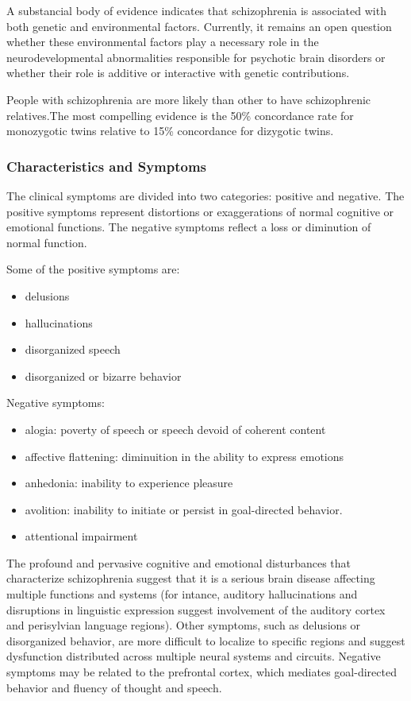 \documentclass[12pt,article,oneside,a4paper]{memoir}
\begin{document}
A substancial body of evidence indicates that schizophrenia is associated with both genetic and environmental factors. Currently, it remains an open question whether these environmental factors play a necessary role in the neurodevelopmental abnormalities responsible for psychotic brain disorders or whether their role is additive or interactive with genetic contributions.

People with schizophrenia are more likely than other to have schizophrenic relatives.The most compelling evidence is the 50\% concordance rate for monozygotic twins relative to 15\% concordance for dizygotic twins.

\subsubsection{Characteristics and Symptoms}

The clinical symptoms are divided into two categories: positive and negative. The positive symptoms represent distortions or exaggerations of normal cognitive or emotional functions. The negative symptoms reflect a loss or diminution of normal function.

Some of the positive symptoms are:
\begin{itemize}
\item delusions
\item hallucinations
\item disorganized speech
\item disorganized or bizarre behavior
\end{itemize}

Negative symptoms:
\begin{itemize}
\item alogia: poverty of speech or speech devoid of coherent content
\item affective flattening: diminuition in the ability to express emotions
\item anhedonia: inability to experience pleasure
\item avolition: inability to initiate or persist in goal-directed behavior.
\item attentional impairment
\end{itemize}

The profound and pervasive cognitive and emotional disturbances that characterize schizophrenia suggest that it is a serious brain disease affecting multiple functions and systems (for intance, auditory hallucinations and disruptions in linguistic expression suggest involvement of the auditory cortex and perisylvian language regions). Other symptoms, such as delusions or disorganized behavior, are more difficult to localize to specific regions and suggest dysfunction distributed across multiple neural systems and circuits. Negative symptoms may be related to the prefrontal cortex, which mediates goal-directed behavior and fluency of thought and speech.
\end{document}
